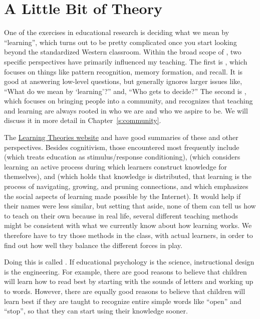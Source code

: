 \chapter{A Little Bit of Theory}\label{s:theory}

One of the exercises in educational research is deciding what we mean
by ``learning'', which turns out to be pretty complicated once you start
looking beyond the standardized Western classroom. Within the broad
scope of , two
specific perspectives have primarily influenced my teaching. The first
is , which focuses on things like pattern
recognition, memory formation, and recall. It is good at answering
low-level questions, but generally ignores larger issues like, ``What
do we mean by `learning'?'' and, ``Who gets to decide?'' The second is
, which focuses on bringing
people into a community, and recognizes that teaching and learning are
always rooted in who we are and who we aspire to be. We will discuss
it in more detail in Chapter~\ref{s:community}.

The \href{http://www.learning-theories.com/}{Learning Theories website} and
\cite{Wibu2016} have good summaries of these and other
perspectives. Besides cognitivism, those encountered most frequently
include  (which treats education as
stimulus/response conditioning), 
(which considers learning an active process during which learners
construct knowledge for themselves), and
 (which holds that knowledge is
distributed, that learning is the process of navigating, growing, and
pruning connections, and which emphasizes the social aspects of
learning made possible by the Internet). It would help if their names
were less similar, but setting that aside, none of them can tell us
how to teach on their own because in real life, several different
teaching methods might be consistent with what we currently know about
how learning works. We therefore have to try those methods in the
class, with actual learners, in order to find out how well they
balance the different forces in play.

Doing this is called .
If educational psychology is the science, instructional design is the
engineering. For example, there are good reasons to believe that
children will learn how to read best by starting with the sounds of
letters and working up to words. However, there are equally good
reasons to believe that children will learn best if they are taught to
recognize entire simple words like ``open'' and ``stop'', so that they can
start using their knowledge sooner.

